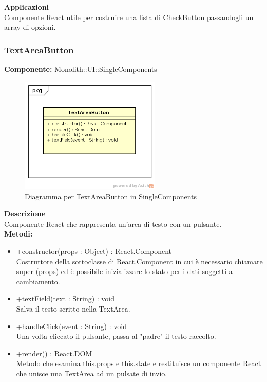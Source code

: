 \textbf{Applicazioni}\\
Componente React utile per costruire una lista di CheckButton passandogli un array di opzioni. 


\clearpage

\subsubsection{TextAreaButton}
\textbf{Componente:}  Monolith::UI::SingleComponents\\
   \FloatBarrier
   \begin{figure}[ht]
   \centering
   \includegraphics[width=0.6\textwidth]{img/single-TextAreaButton}
   \caption{{Diagramma per TextAreaButton in SingleComponents}}
\end{figure}
\FloatBarrier
\textbf{Descrizione}\\
Componente React che rappresenta un'area di testo con un pulsante. \\
\textbf{Metodi:} 
\begin{itemize}

\item +constructor(props : Object) : React.Component 
\\
Costruttore della sottoclasse di React.Component in cui è necessario chiamare super (props) ed è possibile inizializzare lo stato per i dati soggetti a cambiamento.

\item +textField(text : String) : void 
\\
Salva il testo scritto nella TextArea.

\item +handleClick(event : String) : void  
\\
Una volta cliccato il pulsante, passa al "padre" il testo raccolto. 

\item +render() : React.DOM 
\\
Metodo che esamina this.props e this.state e restituisce un componente React che unisce una TextArea ad un pulsate di invio.

\end{itemize} 


